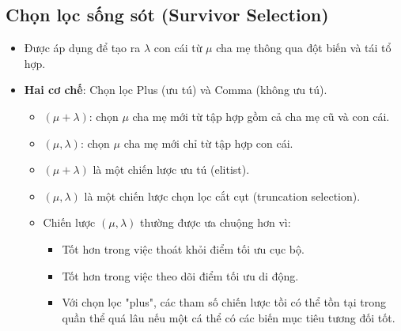 \documentclass{book}
\begin{document}
\subsection{Chọn lọc sống sót (Survivor Selection)}
\begin{itemize}
    \item Được áp dụng để tạo ra $\lambda$ con cái từ $\mu$ cha mẹ thông qua đột biến và tái tổ hợp.
    \item \textbf{Hai cơ chế}: Chọn lọc Plus (ưu tú) và Comma (không ưu tú).
    \begin{itemize}
        \item $(\mu + \lambda)$: chọn $\mu$ cha mẹ mới từ tập hợp gồm cả cha mẹ cũ và con cái.
        \item $(\mu, \lambda)$: chọn $\mu$ cha mẹ mới chỉ từ tập hợp con cái.
        \item $(\mu + \lambda)$ là một chiến lược ưu tú (elitist).
        \item $(\mu, \lambda)$ là một chiến lược chọn lọc cắt cụt (truncation selection).
        \item Chiến lược $(\mu, \lambda)$ thường được ưa chuộng hơn vì:
        \begin{itemize}
            \item Tốt hơn trong việc thoát khỏi điểm tối ưu cục bộ.
            \item Tốt hơn trong việc theo dõi điểm tối ưu di động.
            \item Với chọn lọc "plus", các tham số chiến lược tồi có thể tồn tại trong quần thể quá lâu nếu một cá thể có các biến mục tiêu tương đối tốt.
        \end{itemize}
    \end{itemize}
\end{itemize}
\end{document}
